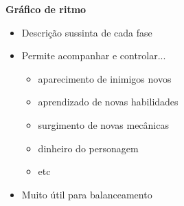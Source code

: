 \expandafter\documentclass\expandafter[table, usenames, svgnames, dvipsnames, \classopts]{beamer}
\begin{document}
\begin{frame}{\textbf{Gráfico de ritmo}}
    \centering
    \begin{minipage}{7cm}
        \begin{itemize}
            \item Descrição sussinta de cada fase
            \item Permite acompanhar e controlar...
            \begin{itemize}
                \item aparecimento de inimigos novos
                \item aprendizado de novas habilidades
                \item surgimento de novas mecânicas
                \item dinheiro do personagem
                \item etc
            \end{itemize}
            \item Muito útil para balanceamento
        \end{itemize}
    \end{minipage}
\end{frame}
\end{document}
